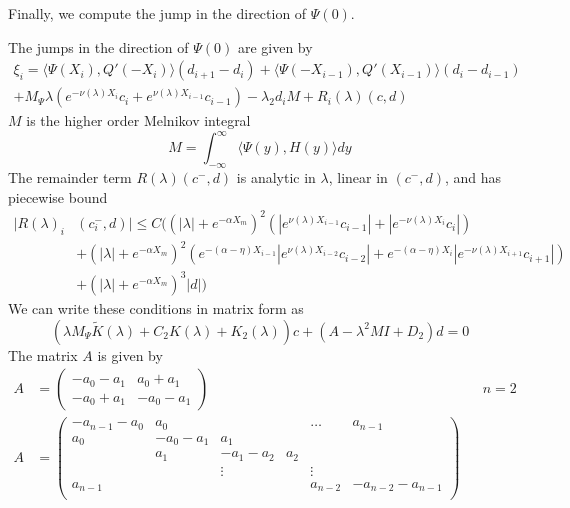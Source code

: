 \documentclass[thesis.tex]{subfiles}
\begin{document}
Finally, we compute the jump in the direction of $\Psi(0)$.
\begin{lemma}\label{jumpadj}
The jumps in the direction of $\Psi(0)$ are given by
\begin{equation}
\begin{aligned}
\xi_i = 
\langle \Psi(X_i), Q'(-X_i) \rangle (d_{i+1} - d_i ) + \langle \Psi(-X_{i-1}), Q'(X_{i-1}) \rangle (d_i - d_{i-1} ) \\
+ M_\Psi \lambda( e^{-\nu(\lambda)X_i}c_i + e^{\nu(\lambda)X_{i-1}}c_{i-1})
- \lambda_2 d_i M + R_i(\lambda)(c, d)
\end{aligned}
\end{equation}
$M$ is the higher order Melnikov integral
\begin{equation}\label{M}
M = \int_{-\infty}^\infty \langle \Psi(y), H(y) \rangle dy
\end{equation}
The remainder term $R(\lambda)(c^-, d)$ is analytic in $\lambda$, linear in $(c^-, d)$, and has piecewise bound
\begin{align*}
|R(\lambda)_i&(c_i^-, d)| \leq C \Big( (|\lambda| + e^{-\alpha X_m})^2(|e^{\nu(\lambda)X_{i-1}}c_{i-1}| + |e^{-\nu(\lambda)X_i}c_i|) \\
&+ (|\lambda| + e^{-\alpha X_m})^2(e^{-(\alpha - \eta) X_{i-1}} |e^{\nu(\lambda)X_{i-2}}c_{i-2}| + e^{-(\alpha - \eta) X_i} |e^{-\nu(\lambda)X_{i+1}}c_{i+1}|) \\
&+ (|\lambda| + e^{-\alpha X_m})^3 |d| \Big)
\end{align*}
We can write these conditions in matrix form as
\begin{equation}
(\lambda M_\Psi \tilde{K}(\lambda) + C_2 K(\lambda) + K_2(\lambda))c + (A - \lambda^2 M I + D_2)d = 0
\end{equation}
The matrix $A$ is given by
\begin{align*}
A &= \begin{pmatrix}
-a_0 -a_1 & a_0 + a_1 \\
-a_0 + a_1 & -a_0 - a_1
\end{pmatrix} && n = 2 \\
A &= \begin{pmatrix}
-a_{n-1} - a_0 & a_0 & & & \dots & a_{n-1}\\
a_0 & -a_0 - a_1 &  a_1 \\
& a_1 & -a_1 - a_2 &  a_2 \\
& & \vdots & & \vdots \\
a_{n-1} & & & & a_{n-2} & -a_{n-2} - a_{n-1} \\

\end{pmatrix}
\end{align*}
\end{lemma}
\end{document}

